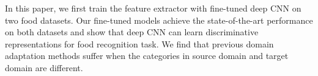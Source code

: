 In this paper, we first train the feature extractor with fine-tuned deep CNN on two food datasets. Our fine-tuned models achieve the state-of-the-art performance on both datasets and show that deep CNN can learn discriminative representations for food recognition task. We find that previous domain adaptation methods suffer when the categories in source domain and target domain are different. 

